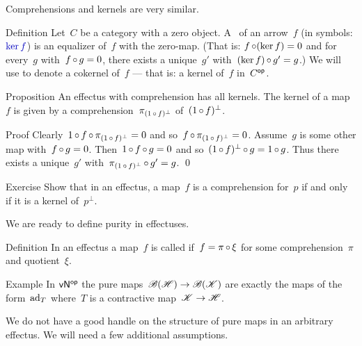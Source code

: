 \documentclass[b]{subfiles}
\begin{document}
\begin{parsec}%
\begin{point}%
Comprehensions and kernels are very similar.
\end{point}
\begin{point}{Definition}%
Let~$C$ be a category with a zero object.
A ~of an arrow~$f$
    (in symbols: $\Define{\ker f}$)
    is an equalizer of~$f$ with the zero-map.
(That is: $f \mathop{\circ} (\ker f) = 0$
    and for every~$g$ with~$f \mathop{\circ} g = 0$,
    there exists a unique~$g'$ with~$(\ker f) \mathop{\circ} g' = g$.)
We will use 
    to denote a cokernel of~$f$
    --- that is: a kernel of~$f$ in~${C}{^{\mathsf{op}}}$.
\end{point}
\begin{point}{Proposition}%
An effectus with comprehension has all kernels.
    The kernel of a map~$f$ is given by
        a comprehension~$\pi_{(1 \mathop{\circ} f)^\perp}$
        of~$(1 \mathop{\circ} f)^\perp$.
\begin{point}{Proof}%
Clearly~$1 \mathop{\circ} f \mathop{\circ} \pi_{(1 \mathop{\circ} f)^\perp} = 0$
    and so~$f \mathop{\circ} \pi_{(1 \mathop{\circ} f)^\perp} = 0$.
Assume~$g$ is some other map with~$f \mathop{\circ} g = 0$.
Then~$1 \mathop{\circ} f \mathop{\circ} g = 0$
    and so~$(1 \mathop{\circ} f)^\perp \mathop{\circ} g = 1 \mathop{\circ} g$.
Thus there exists a unique~$g'$
    with~$\pi_{(1 \mathop{\circ} f)^\perp} \mathop{\circ} g' = g$. \qed
\end{point}
\end{point}
\begin{point}{Exercise}%
Show that in an effectus,
    a map~$f$ is a comprehension for~$p$
    if and only if it is a kernel of~$p^\perp$.
\end{point}
\end{parsec}

\begin{parsec}%
\begin{point}%
We are ready to define purity in effectuses.
\end{point}
\begin{point}{Definition}%
In an effectus a map~$f$ is called 
    if~$f = \pi \mathop{\circ} \xi$
    for some comprehension~$\pi$
    and quotient~$\xi$.
\end{point}
\begin{point}{Example}%
In ${\mathsf{vN}}{^{\mathsf{op}}}$
the pure maps~$\mathscr{B}(\mathscr{H}) \to \mathscr{B}(\mathscr{K})$
    are exactly the maps of the form~$\mathrm{ad}_T$
    where~$T$ is a contractive map~$\mathscr{K} \to \mathscr{H}$. 
\end{point}
\begin{point}%
We do not have a good handle on the structure of pure maps in
    an arbitrary effectus.  We will need a few additional assumptions.
\end{point}
\end{parsec}
\end{document}
